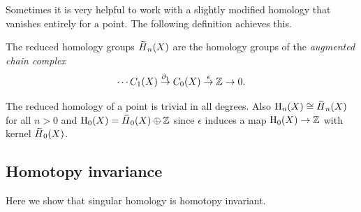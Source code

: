 Sometimes it is very helpful to work with a slightly modified homology that vanishes entirely for a point. The following definition achieves this.

\begin{defn}
    The reduced homology groups $\wt{H}_n(X)$ are the homology groups of the \emph{augmented chain complex}
    \[\cdots C_1(X)\overset{\partial_1}\to C_0(X)\overset{\epsilon}\to \mathbb{Z}\to 0.\]
\end{defn}

The reduced homology of a point is trivial in all degrees. Also $\rmH_n(X)\cong \wt{H}_n(X)$ for all $n>0$ and $\rmH_0(X)=\wt{H}_0(X)\oplus \bbZ$ since $\epsilon$ induces a map $\mathrm{H}_0(X)\to \mathbb{Z}$ with kernel $\wt{H}_0(X)$.




\subsection{Homotopy invariance}

Here we show that singular homology is homotopy invariant.

